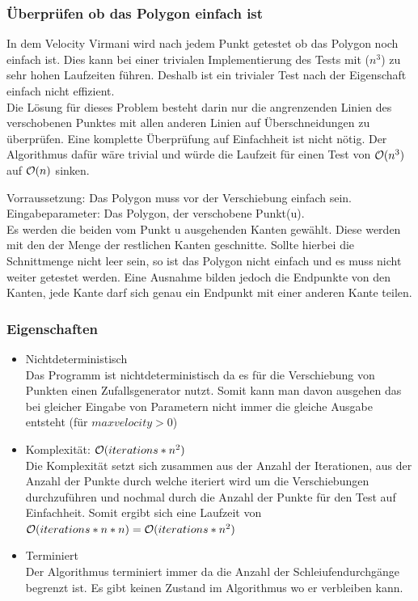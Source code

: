   \subsubsection{Überprüfen ob das Polygon einfach ist}
    In dem Velocity Virmani wird nach jedem Punkt getestet ob das Polygon 
    noch einfach ist. Dies kann bei einer trivialen Implementierung des 
    Tests mit \bigO($n^3$) zu sehr hohen Laufzeiten führen.
    Deshalb ist ein trivialer Test nach der Eigenschaft einfach nicht 
    effizient.\smallskip \\ 
    Die Lösung für dieses Problem besteht darin nur die angrenzenden 
    Linien des verschobenen Punktes mit allen anderen Linien auf 
    Überschneidungen zu überprüfen. Eine komplette Überprüfung auf 
    Einfachheit ist nicht nötig.
    Der Algorithmus dafür wäre trivial und würde die Laufzeit für einen 
    Test von $\mathcal{O}(n^3)$ auf $\mathcal{O}(n)$ sinken.

    Vorraussetzung: Das Polygon muss vor der Verschiebung einfach sein.\\
    Eingabeparameter: Das Polygon, der verschobene Punkt(u).\\
    Es werden die beiden vom Punkt u ausgehenden Kanten gewählt. 
    Diese werden mit den der Menge der restlichen Kanten geschnitte.
    Sollte hierbei die Schnittmenge nicht leer sein,
    so ist das Polygon nicht einfach und es muss 
    nicht weiter getestet werden. Eine Ausnahme bilden jedoch die 
    Endpunkte von den Kanten, jede Kante darf sich genau ein Endpunkt mit 
    einer anderen Kante teilen.


  \subsubsection{Eigenschaften}
    \begin{itemize}
      \item Nichtdeterministisch\\
      Das Programm ist nichtdeterministisch da es für die Verschiebung 
      von Punkten einen Zufallsgenerator nutzt. Somit kann man davon 
      ausgehen das bei gleicher Eingabe von Parametern nicht immer die 
      gleiche Ausgabe entsteht (für $maxvelocity > 0$)
      \item Komplexität: $\mathcal{O}(iterations*n^2)$\\
      Die Komplexität setzt sich zusammen aus der Anzahl der 
      Iterationen, aus der Anzahl der Punkte durch welche iteriert wird 
      um die Verschiebungen durchzuführen und nochmal durch die Anzahl 
      der Punkte für den Test auf Einfachheit. Somit ergibt sich eine 
      Laufzeit von $\mathcal{O}(iterations*n*n) = \mathcal{O}(iterations*n^2)$
      \item Terminiert\\
      Der Algorithmus terminiert immer da die Anzahl der 
      Schleiufendurchgänge begrenzt ist. Es gibt keinen Zustand im 
      Algorithmus wo er verbleiben kann.
    \end{itemize}


